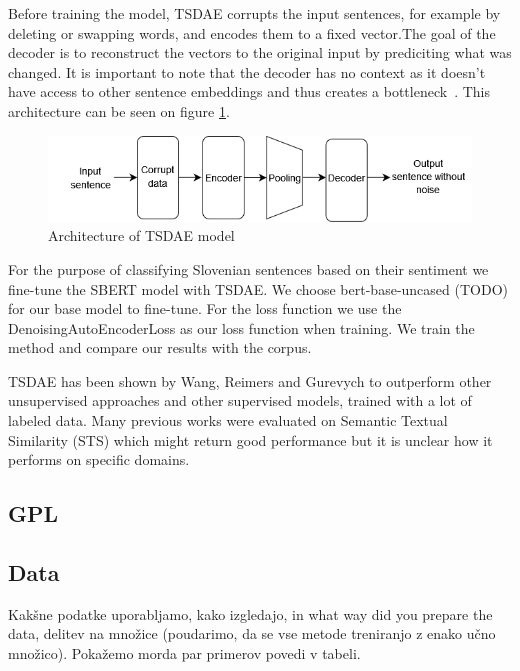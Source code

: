 \documentclass[fleqn,moreauthors,10pt]{ds_report}
\begin{document}
Before training the model, TSDAE corrupts the input sentences, for example by deleting or swapping words, and encodes them to a fixed vector.The goal of the decoder is to reconstruct the vectors to the original input by prediciting what was changed. It is important to note that the decoder has no context as it doesn't have access to other sentence embeddings and thus creates a bottleneck~\cite{wang-etal-2021-tsdae-using}.  This architecture can be seen on figure \ref{fig:tsdae}.

\begin{figure}[ht]\centering
	\includegraphics[width=\linewidth]{TSDAEdiagram.png}
	\caption{Architecture of TSDAE model}
	\label{fig:tsdae}
\end{figure}

For the purpose of classifying Slovenian sentences based on their sentiment we fine-tune the SBERT model with TSDAE. We choose bert-base-uncased (TODO) for our base model to fine-tune. For the loss function we use the DenoisingAutoEncoderLoss as our loss function when training. We train the method and compare our results with the corpus.


TSDAE has been shown by Wang, Reimers and Gurevych \cite{wang-etal-2021-tsdae-using} to outperform other unsupervised approaches and other supervised models, trained with a lot of labeled data. Many previous works were evaluated on Semantic Textual Similarity (STS) which might return good performance but it is unclear how it performs on specific domains. 


\subsection*{GPL}

\subsection*{Data}
Kakšne podatke uporabljamo, kako izgledajo, in what way did you prepare the data, delitev na množice (poudarimo, da se vse metode treniranjo z enako učno množico).
Pokažemo morda par primerov povedi v tabeli.
\end{document}
